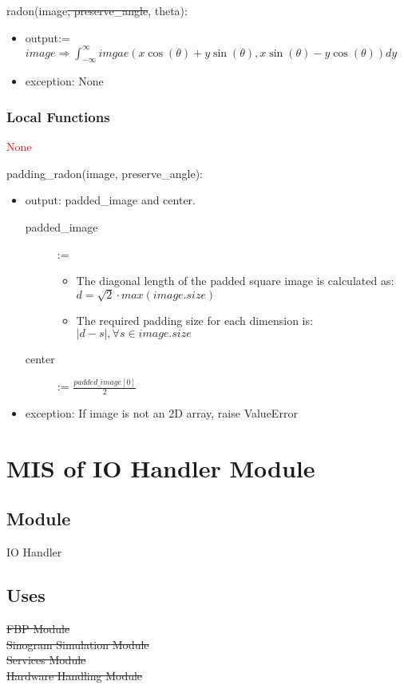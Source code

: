 \documentclass[12pt, titlepage]{article}
\newcommand{\add}{\textcolor{red}}
\begin{document}
\noindent
radon(image\st{, preserve\_angle}, theta):
\begin{itemize}
\item output:= \(image \Rightarrow \int_{-\infty}^{\infty} imgae(x\cos(\theta) + y\sin(\theta),
        x\sin(\theta) - y\cos(\theta))dy\)
\item exception: None
\end{itemize}

\subsubsection{Local Functions}
\add{None}
\begin{cross}
\noindent
padding\_radon(image, preserve\_angle):
\begin{itemize}
\item output: padded\_image and center.
  \begin{description}
    \item[padded\_image] :=
      \begin{itemize}
      \item The diagonal length of the padded square image is calculated as:
        \(d = \sqrt{2}\cdot max(image.size)\)
      \item The required padding size for each dimension is: \(|d - s|, \forall s \in image.size\)
      \end{itemize}
    \item[center] := \(\frac{padded\_image[0]}{2}\)
  \end{description}
\item exception: If image is not an 2D array, raise ValueError
\end{itemize}
\end{cross}

\newpage
\section{MIS of IO Handler Module} \label{ModuleIO}

\subsection{Module}
IO Handler

\subsection{Uses}
\st{
  FBP Module\\
  Sinogram Simulation Module\\
  Services Module\\
  Hardware Handling Module\\
}
\end{document}
